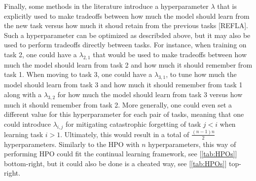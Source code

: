 \documentclass[11pt]{article}
\begin{document}
\vspace{1mm}
\noindent
Finally, some methods in the literature introduce a hyperparameter $\lambda$ that is explicitly used to make tradeoffs between how much the model should learn from the new task versus how much it shoud retain from the previous tasks [REFLA]. Such a hyperparameter can be optimized as describded above, but it may also be used to perform tradeoffs directly between tasks. For instance, when training on task 2, one could have a $\lambda_{2,1}$ that would be used to make tradeoffs between how much the model should learn from task 2 and how much it should remember from task 1. When moving to task 3, one could have a $\lambda_{3,1}$, to tune how much the model should learn from task 3 and how much it should remember from task 1 along with a $\lambda_{3,2}$ for how much the model should learn from task 3 versus how much it should remember from task 2. More generally, one could even set a different value for this hyperparameter for each pair of tasks, meaning that one could introduce $\lambda_{i,j}$ for mitigating catastrophic forgetting of task $j<i$ when learning task $i>1$. Ultimately, this would result in a total of $\frac{(n-1)n}{2}$ hyperparameters. Similarly to the HPO with $n$ hyperparameters, this way of performing HPO could fit the continual learning framework, see [\ref{tab:HPOs}] bottom-right, but it could also be done is a cheated way, see [\ref{tab:HPOs}] top-right.


\end{document}
